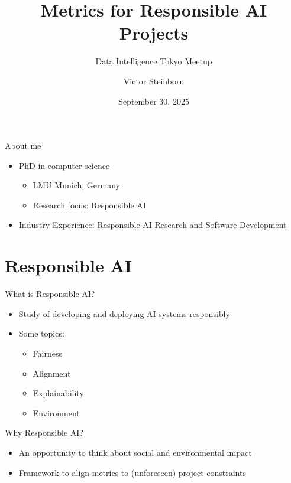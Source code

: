 

\title{Metrics for Responsible AI Projects}
\subtitle{Data Intelligence Tokyo Meetup}
\author{Victor Steinborn}
\date{September 30, 2025}



\frame{\titlepage}

\begin{frame}{About me}
	\begin{itemize}
		\item PhD in computer science
		      \begin{itemize}
			      \item LMU Munich, Germany
			      \item Research focus: Responsible AI
		      \end{itemize}
		\item Industry Experience: Responsible AI Research and Software Development
	\end{itemize}
\end{frame}

\section{Responsible AI}

\begin{frame}{What is Responsible AI?}
	\begin{itemize}
		\item Study of developing and deploying AI systems responsibly
		\item Some topics:
		      \begin{itemize}
			      \item Fairness
			      \item Alignment
			      \item Explainability
			      \item Environment
		      \end{itemize}
	\end{itemize}
\end{frame}

\begin{frame}{Why Responsible AI?}
	\begin{itemize}
		\item An opportunity to think about social and environmental impact
		\item Framework to align metrics to (unforeseen) project constraints
	\end{itemize}
\end{frame}

